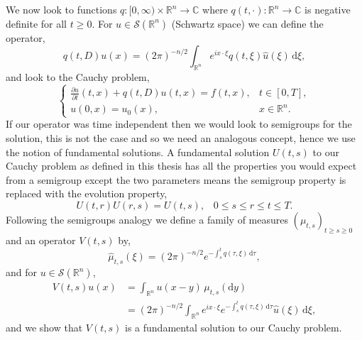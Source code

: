 \documentclass[a4paper, 12pt]{report}
\theoremstyle{cor}
\theoremstyle{remark}
\theoremstyle{definition}
\begin{document}
We now look to functions $q : [0, \infty) \times \mathbb{R}^n \to \mathbb{C}$ where $q(t, \cdot) : \mathbb{R}^n \to \mathbb{C}$ is negative definite for all $t \ge 0$.  For $u \in \mathcal{S}(\mathbb{R}^n)$ (Schwartz space) we can define the operator,
$$
q(t, D)u(x) = (2\pi)^{-n/2}\int_{\mathbb{R}^n}e^{ix\cdot\xi}q(t, \xi)\hat{u}(\xi)\,\mathrm{d}\xi,
$$
and look to the Cauchy problem,
$$
\begin{cases}
\frac{\partial u}{\partial t}(t, x) + q(t, D)u(t, x) = f(t, x), & t \in [0, T],\\
u(0, x) = u_0(x), & x \in \mathbb{R}^n.
\end{cases}
$$
If our operator was time independent then we would look to semigroups for the solution, this is not the case and so we need an analogous concept, hence we use the notion of fundamental solutions.  A fundamental solution $U(t, s)$ to our Cauchy problem as defined in this thesis has all the properties you would expect from a semigroup except the two parameters means the semigroup property is replaced with the evolution property,
$$
U(t, r)U(r, s) = U(t, s), \,\,\,\,\, 0 \le s \le r \le t \le T.
$$
Following the semigroups analogy we define a family of measures $(\mu_{t, s})_{t \ge s \ge 0}$ and an operator $V(t, s)$ by,
$$
\hat{\mu}_{t, s}(\xi) = (2\pi)^{-n/2}e^{-\int_s^tq(\tau, \xi)\,\mathrm{d}\tau},
$$
and for $u \in \mathcal{S}(\mathbb{R}^n)$,
$$
\begin{aligned}
V(t, s)u(x) & = \int_{\mathbb{R}^n}u(x - y)\,\mu_{t, s}(\mathrm{d}y)\\
& = (2\pi)^{-n/2}\int_{\mathbb{R}^n}e^{ix\cdot\xi}e^{-\int_s^tq(\tau, \xi)\,\mathrm{d}\tau}\hat{u}(\xi)\,\mathrm{d}\xi,
\end{aligned}
$$
and we show that $V(t, s)$ is a fundamental solution to our Cauchy problem.
\end{document}
